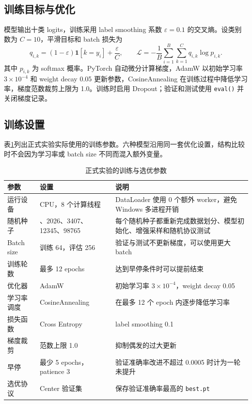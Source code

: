 \subsection{训练目标与优化}

模型输出十类 logits，训练采用 label smoothing 系数 $\varepsilon=0.1$ 的交叉熵。设类别数为 $C=10$，平滑目标和 batch 损失为
\[
  q_{i,k}=(1-\varepsilon)\mathbf{1}[k=y_i]+\frac{\varepsilon}{C},
  \qquad
  \mathcal L=-\frac{1}{B}\sum_{i=1}^{B}\sum_{k=1}^{C}q_{i,k}\log p_{i,k}.
\]
其中 $p_{i,k}$ 为 softmax 概率。PyTorch 自动微分计算梯度，AdamW 以初始学习率 $3\times10^{-4}$ 和 weight decay 0.05 更新参数，CosineAnnealing 在训练过程中降低学习率，梯度范数裁剪上限为 1.0。训练时启用 Dropout；验证和测试使用 \texttt{eval()} 并关闭梯度记录。

\subsection{训练设置}

表\ref{tab:training-settings}列出正式实验实际使用的训练参数。六种模型沿用同一套优化设置，结构比较时不会因为学习率或 batch size 不同而混入额外变量。

\begin{table}[H]
  \centering
  \caption{正式实验的训练与选优参数}
  \label{tab:training-settings}
  \renewcommand{\arraystretch}{1.15}
  \begin{tabularx}{\textwidth}{>{\raggedright\arraybackslash}p{}>{\raggedright\arraybackslash}p{}>{\raggedright\arraybackslash}X}
    \toprule
    参数 & 设置 & 说明 \\
    \midrule
    运行设备 & CPU，8 个计算线程 & DataLoader 使用 0 个额外 worker，避免 Windows 多进程开销 \\
    随机种子 & 42、2026、3407、12345、98765 & 每个随机种子都重新完成数据划分、模型初始化、增强采样和随机协议测试 \\
    Batch size & 训练 64，评估 256 & 验证与测试不更新梯度，可以使用更大 batch \\
    训练轮数 & 最多 12 epochs & 达到早停条件时可以提前结束 \\
    优化器 & AdamW & 初始学习率 $3\times10^{-4}$，weight decay 0.05 \\
    学习率调度 & CosineAnnealing & 在最多 12 个 epoch 内逐步降低学习率 \\
    损失函数 & Cross Entropy & label smoothing 0.1 \\
    梯度裁剪 & 范数上限 1.0 & 抑制偶发的过大更新 \\
    早停 & 最少 5 epochs，patience 3 & 验证准确率改进不超过 0.0005 时计为一轮未提升 \\
    选优协议 & Center 验证集 & 保存验证准确率最高的 \texttt{best.pt} \\
    \bottomrule
  \end{tabularx}
\end{table}

